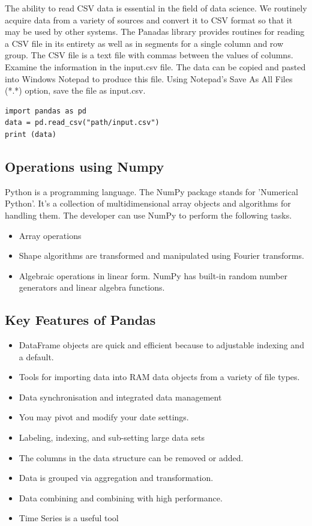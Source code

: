 The ability to read CSV data is essential in the field of data science. We routinely
acquire data from a variety of sources and convert it to CSV format so that it may
be used by other systems. The Panadas library provides routines for reading a CSV
file in its entirety as well as in segments for a single column and row group.
The CSV file is a text file with commas between the values of columns. Examine
the information in the input.csv file. The data can be copied and pasted into
Windows Notepad to produce this file. Using Notepad's Save As All Files (*.*)
option, save the file as input.csv.


\begin{tcolorbox}
\begin{verbatim}
import pandas as pd
data = pd.read_csv("path/input.csv")
print (data)
\end{verbatim}
\end{tcolorbox}

\subsection{Operations using Numpy}

Python is a programming language. The NumPy package stands for 'Numerical
Python'. It's a collection of multidimensional array objects and algorithms for
handling them.
The developer can use NumPy to perform the following tasks.

\begin{itemize}
\item Array operations
\item Shape algorithms are transformed and manipulated using Fourier transforms.
\item Algebraic operations in linear form. NumPy has built-in random number
generators and linear algebra functions.

\end{itemize}

\subsection{Key Features of Pandas}

\begin{itemize}
\item DataFrame objects are quick and efficient because to adjustable indexing and a
default.
\item Tools for importing data into RAM data objects from a variety of file types.
\item Data synchronisation and integrated data management
\item You may pivot and modify your date settings.
\item Labeling, indexing, and sub-setting large data sets
\item The columns in the data structure can be removed or added.
\item Data is grouped via aggregation and transformation.
\item Data combining and combining with high performance.
\item Time Series is a useful tool
\end{itemize}

